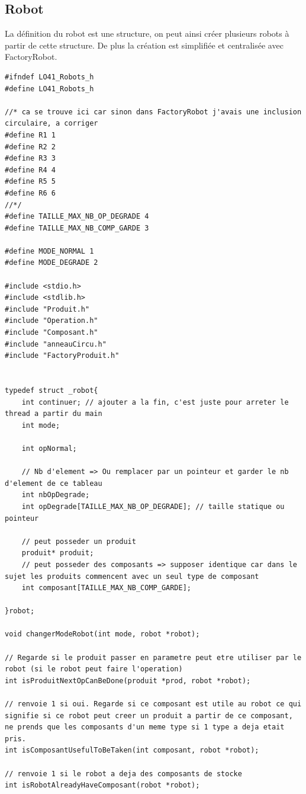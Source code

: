 \documentclass{report}
\begin{document}
\subsection{Robot}
La définition du robot est une structure, on peut ainsi créer plusieurs robots à partir de cette structure. De plus la création est simplifiée et centralisée avec FactoryRobot.
\begin{lstlisting}[caption=Représentation des robots]
#ifndef LO41_Robots_h
#define LO41_Robots_h

//* ca se trouve ici car sinon dans FactoryRobot j'avais une inclusion circulaire, a corriger
#define R1 1
#define R2 2
#define R3 3
#define R4 4
#define R5 5
#define R6 6
//*/
#define TAILLE_MAX_NB_OP_DEGRADE 4
#define TAILLE_MAX_NB_COMP_GARDE 3

#define MODE_NORMAL 1
#define MODE_DEGRADE 2

#include <stdio.h>
#include <stdlib.h>
#include "Produit.h"
#include "Operation.h"
#include "Composant.h"
#include "anneauCircu.h"
#include "FactoryProduit.h"


typedef struct _robot{
    int continuer; // ajouter a la fin, c'est juste pour arreter le thread a partir du main
    int mode;
    
    int opNormal;
    
    // Nb d'element => Ou remplacer par un pointeur et garder le nb d'element de ce tableau
    int nbOpDegrade;
    int opDegrade[TAILLE_MAX_NB_OP_DEGRADE]; // taille statique ou pointeur
    
    // peut posseder un produit
    produit* produit;
    // peut posseder des composants => supposer identique car dans le sujet les produits commencent avec un seul type de composant
    int composant[TAILLE_MAX_NB_COMP_GARDE];
    
}robot;

void changerModeRobot(int mode, robot *robot);

// Regarde si le produit passer en parametre peut etre utiliser par le robot (si le robot peut faire l'operation)
int isProduitNextOpCanBeDone(produit *prod, robot *robot);

// renvoie 1 si oui. Regarde si ce composant est utile au robot ce qui signifie si ce robot peut creer un produit a partir de ce composant, ne prends que les composants d'un meme type si 1 type a deja etait pris.
int isComposantUsefulToBeTaken(int composant, robot *robot);

// renvoie 1 si le robot a deja des composants de stocke
int isRobotAlreadyHaveComposant(robot *robot);


\end{lstlisting}
\end{document}
